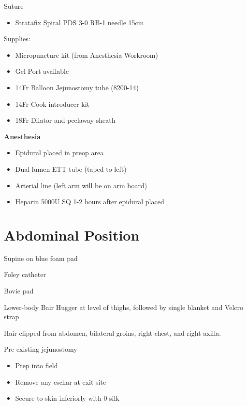 \documentclass[
  letterpaper,
]{scrbook}
\providecommand{\tightlist}{%
  \setlength{\itemsep}{0pt}\setlength{\parskip}{0pt}}
\begin{document}
Suture

\begin{itemize}
\tightlist
\item
  Stratafix Spiral PDS 3-0 RB-1 needle 15cm
\end{itemize}

Supplies:

\begin{itemize}
\tightlist
\item
  Micropuncture kit (from Anesthesia Workroom)
\item
  Gel Port available
\item
  14Fr Balloon Jejunostomy tube (8200-14)
\item
  14Fr Cook introducer kit
\item
  18Fr Dilator and peelaway sheath
\end{itemize}

\newpage

\textbf{Anesthesia}

\begin{itemize}
\tightlist
\item
  Epidural placed in preop area
\item
  Dual-lumen ETT tube (taped to left)
\item
  Arterial line (left arm will be on arm board)
\item
  Heparin 5000U SQ 1-2 hours after epidural placed
\end{itemize}

\section{Abdominal Position}\label{abdominal-position-1}

Supine on blue foam pad

Foley catheter

Bovie pad

Lower-body Bair Hugger at level of thighs, followed by single blanket
and Velcro strap

Hair clipped from abdomen, bilateral groins, right chest, and right
axilla.

Pre-existing jejunostomy

\begin{itemize}
\tightlist
\item
  Prep into field
\item
  Remove any eschar at exit site
\item
  Secure to skin inferiorly with 0 silk
\end{itemize}
\end{document}
